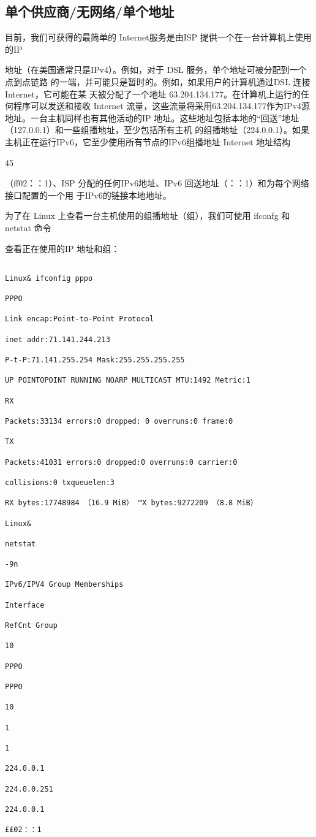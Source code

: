 \subsection{单个供应商/无网络/单个地址}
目前，我们可获得的最简单的 Internet服务是由ISP 提供一个在一台计算机上使用的IP

地址（在美国通常只是IPv4）。例如，对于 DSL 服务，单个地址可被分配到一个点到点链路
的一端，并可能只是暂时的。例如，如果用户的计算机通过DSL 连接 Internet，它可能在某
天被分配了一个地址 63.204.134.177。在计算机上运行的任何程序可以发送和接收 Internet
流量，这些流量将采用63.204.134.177作为IPv4源地址。一台主机同样也有其他活动的IP
地址。这些地址包括本地的“回送”地址（127.0.0.1）和一些组播地址，至少包括所有主机
的组播地址（224.0.0.1）。如果主机正在运行IPv6，它至少使用所有节点的IPv6组播地址
Internet 地址结构

45

（ff02：：1）、ISP 分配的任何IPv6地址、IPv6 回送地址（：：1）和为每个网络接口配置的一个用
于IPv6的链接本地地址。

为了在 Linux 上查看一台主机使用的组播地址（组），我们可使用 ifconfg 和 netstat 命令

查看正在使用的IP 地址和组：

\begin{verbatim}
    
Linux& ifconfig pppo

PPPO

Link encap:Point-to-Point Protocol

inet addr:71.141.244.213

P-t-P:71.141.255.254 Mask:255.255.255.255

UP POINTOPOINT RUNNING NOARP MULTICAST MTU:1492 Metric:1

RX

Packets:33134 errors:0 dropped: 0 overruns:0 frame:0

TX

Packets:41031 errors:0 dropped:0 overruns:0 carrier:0

collisions:0 txqueuelen:3

RX bytes:17748984 （16.9 MiB） ™X bytes:9272209 （8.8 MiB）

Linux&

netstat

-9n

IPv6/IPV4 Group Memberships

Interface

RefCnt Group

10

PPPO

PPPO

10

1

1

224.0.0.1

224.0.0.251

224.0.0.1

££02：：1
\end{verbatim}

